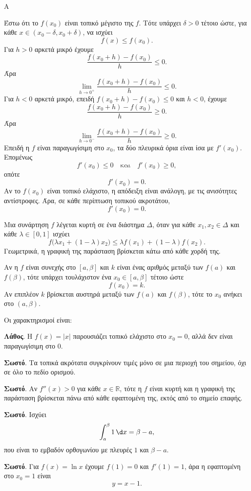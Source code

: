 \begin{thema}{Α}
\begin{erwthma}
\item Έστω ότι το $f(x_0)$ είναι τοπικό μέγιστο της $f$. Τότε υπάρχει $\delta>0$ τέτοιο ώστε, για κάθε $x\in(x_0-\delta,x_0+\delta)$, να ισχύει
\[
f(x)\leq f(x_0).
\]
Για $h>0$ αρκετά μικρό έχουμε
\[
\frac{f(x_0+h)-f(x_0)}{h}\leq0.
\]
Άρα
\[
\lim_{h\to0^+}\frac{f(x_0+h)-f(x_0)}{h}\leq0.
\]
Για $h<0$ αρκετά μικρό, επειδή $f(x_0+h)-f(x_0)\leq0$ και $h<0$, έχουμε
\[
\frac{f(x_0+h)-f(x_0)}{h}\geq0.
\]
Άρα
\[
\lim_{h\to0^-}\frac{f(x_0+h)-f(x_0)}{h}\geq0.
\]
Επειδή η $f$ είναι παραγωγίσιμη στο $x_0$, τα δύο πλευρικά όρια είναι ίσα με $f'(x_0)$. Επομένως
\[
f'(x_0)\leq0
\quad\text{και}\quad
f'(x_0)\geq0,
\]
οπότε
\[
f'(x_0)=0.
\]
Αν το $f(x_0)$ είναι τοπικό ελάχιστο, η απόδειξη είναι ανάλογη, με τις ανισότητες αντίστροφες. Άρα, σε κάθε περίπτωση τοπικού ακροτάτου,
\[
{f'(x_0)=0}.
\]

\item Μια συνάρτηση $f$ λέγεται κυρτή σε ένα διάστημα $\varDelta$, όταν για κάθε $x_1,x_2\in\varDelta$ και κάθε $\lambda\in[0,1]$ ισχύει
\[
f\bigl(\lambda x_1+(1-\lambda)x_2\bigr)
\leq
\lambda f(x_1)+(1-\lambda)f(x_2).
\]
Γεωμετρικά, η γραφική της παράσταση βρίσκεται κάτω από κάθε χορδή της.

\item Αν η $f$ είναι συνεχής στο $[a,\beta]$ και $k$ είναι ένας αριθμός μεταξύ των $f(a)$ και $f(\beta)$, τότε υπάρχει τουλάχιστον ένα $x_0\in[a,\beta]$ τέτοιο ώστε
\[
f(x_0)=k.
\]
Αν επιπλέον $k$ βρίσκεται αυστηρά μεταξύ των $f(a)$ και $f(\beta)$, τότε το $x_0$ ανήκει στο $(a,\beta)$.

\item Οι χαρακτηρισμοί είναι:
\begin{alist}
\item \textbf{Λάθος}. Η $f(x)=|x|$ παρουσιάζει τοπικό ελάχιστο στο $x_0=0$, αλλά δεν είναι παραγωγίσιμη στο $0$.
\item \textbf{Σωστό}. Τα τοπικά ακρότατα συγκρίνουν τιμές μόνο σε μια περιοχή του σημείου, όχι σε όλο το πεδίο ορισμού.
\item \textbf{Σωστό}. Αν $f''(x)>0$ για κάθε $x\in\mathbb{R}$, τότε η $f$ είναι κυρτή και η γραφική της παράσταση βρίσκεται πάνω από κάθε εφαπτομένη της, εκτός από το σημείο επαφής.
\item \textbf{Σωστό}. Ισχύει
\[
\dint_a^\beta 1\,\d x=\beta-a,
\]
που είναι το εμβαδόν ορθογωνίου με πλευρές $1$ και $\beta-a$.
\item \textbf{Σωστό}. Για $f(x)=\ln x$ έχουμε $f(1)=0$ και $f'(1)=1$, άρα η εφαπτομένη στο $x_0=1$ είναι
\[
y=x-1.
\]
\end{alist}
\end{erwthma}
\end{thema}

